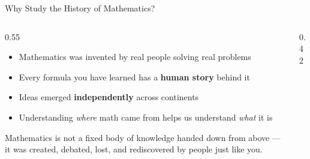 \begin{frame}[shrink=14]{Why Study the History of Mathematics?}

  \begin{columns}[T]
    \begin{column}{0.55\textwidth}
      \begin{itemize}
        \item Mathematics was \alert{invented by real people} solving real problems
        \item Every formula you have learned has a \textbf{human story} behind it
        \item Ideas emerged \textbf{independently} across continents
        \item Understanding \emph{where} math came from helps us understand \emph{what} it is
      \end{itemize}

      \vspace{0.8em}
      \begin{insightbox}
        Mathematics is not a fixed body of knowledge handed down from above
        --- it was created, debated, lost, and rediscovered by people just like you.
      \end{insightbox}
    \end{column}

    \begin{column}{0.42\textwidth}
    \end{column}
  \end{columns}

\end{frame}

